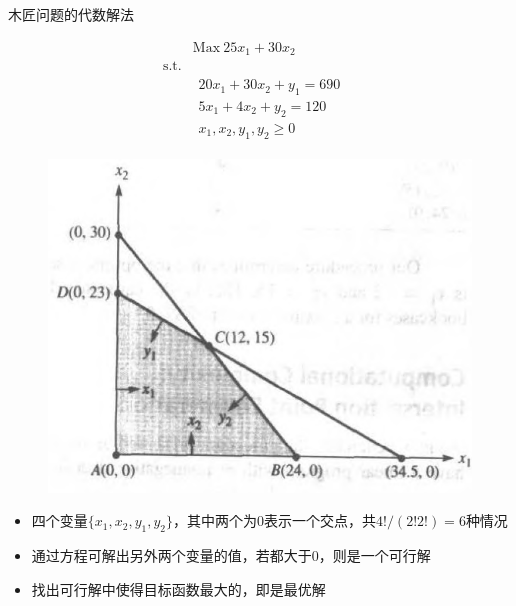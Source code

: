 \documentclass[mathserif, table]{beamer}
\begin{document}
\begin{frame}{木匠问题的代数解法}
  \begin{figure}
    \begin{minipage}{.5\linewidth}
      \[ 
      \begin{array}{lcl}
        & \mbox{Max}\ 25x_1 + 30x_2 & \\
        \mbox{s.t.} & &  \\
        &
        \begin{array}{c}
          20x_1 + 30x_2 + y_1 = 690\\
          5x_1 + 4x_2 + y_2 = 120\\
          x_1, x_2, y_1, y_2 \ge 0
        \end{array}
        &
      \end{array}
      \]
    \end{minipage}%
    \begin{minipage}{.5\linewidth}
      \includegraphics[width=\textwidth{}]{wood-var.png}
    \end{minipage}
  \end{figure}
  
  \begin{itemize}
  \item 四个变量$\{x_1, x_2, y_1, y_2\}$，其中两个为0表示一个交点，共$4!/(2!2!)=6$种情况
  \item 通过方程可解出另外两个变量的值，若都大于0，则是一个可行解
  \item 找出可行解中使得目标函数最大的，即是最优解
  \end{itemize}

\end{frame}
\end{document}
